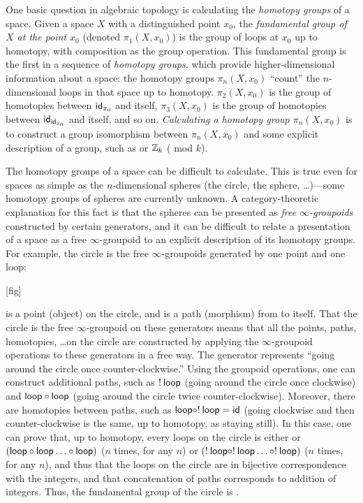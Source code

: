 One basic question in algebraic topology is calculating the
\emph{homotopy groups} of a space.  Given a space $X$ with a
distinguished point $x_0$, the \emph{fundamental group of $X$ at the point $x_0$} (denoted
$\pi_1(X,x_0)$) is the group of loops at $x_0$ up to homotopy, with composition as the group operation.
This fundamental group is the first in a sequence of \emph{homotopy
  groups}, which provide higher-dimensional information about a space:
the homotopy groups $\pi_n(X,x_0)$ ``count'' the $n$-dimensional loops in 
that space up to homotopy.  $\pi_2(X,x_0)$ is the group of homotopies between
$\mathsf{id}_{{x_0}}$ and itself, $\pi_3(X,x_0)$ is the group of homotopies
between $\mathsf{id}_{\mathsf{id}_{{x_0}}}$ and itself, and so on.
\emph{Calculating a homotopy group $\pi_n(X,x_0)$} is to construct a group isomorphism
between $\pi_n(X,x_0)$ and some explicit description of a group,
such as \Z\/ or $\mathbb{Z}_k$ (\Z\/ mod $k$).  

The homotopy groups of a space can be difficult to calculate.  This is
true even for spaces as simple as the $n$-dimensional spheres (the
circle, the sphere, \ldots)---some homotopy groups of spheres are
currently unknown.  A category-theoretic explanation for this fact is
that the spheres can be presented as \emph{free
  $\infty$-groupoids} constructed by certain generators, and it can be
difficult to relate a presentation of a space as a free
$\infty$-groupoid to an explicit description of its homotopy groups.
For example, the circle is the free $\infty$-groupoids generated by one point
and one loop:

[fig]

 is a point (object) on the circle, and  is a path
(morphism) from  to itself.  That the circle is the free
$\infty$-groupoid on these generators means that all the points, paths,
homotopies, \ldots on the circle are constructed by applying the
$\infty$-groupoid operations to these generators in a free way.  The generator
 represents ``going around the circle once
counter-clockwise.''  Using the groupoid operations, one can construct
additional paths, such as $! \: \mathsf{loop}$ (going around the circle once
clockwise) and $\mathsf{loop} \mathbin{\circ} \mathsf{loop}$ (going around the circle
twice counter-clockwise).  Moreover, there are homotopies between paths,
such as $\mathsf{loop} \mathbin{\circ} ! \: \mathsf{loop} = \mathsf{id}$ (going clockwise and
then counter-clockwise is the same, up to homotopy, as staying still).
In this case, one can prove that, up to homotopy,
every loops on the circle is either  or $(\mathsf{loop} \mathbin{\circ}
\mathsf{loop} \ldots \mathbin{\circ} \mathsf{loop})$ ($n$ times, for any $n$) or $(! \: 
\mathsf{loop} \mathbin{\circ} ! \:   \mathsf{loop} \ldots \mathbin{\circ} ! \:  \mathsf{loop})$ ($n$ times,
for any $n$), and thus that the loops on the circle are in bijective
correspondence with the integers, and that concatenation of paths corresponds to
addition of integers.  Thus, the fundamental group of the
circle is \Z.

